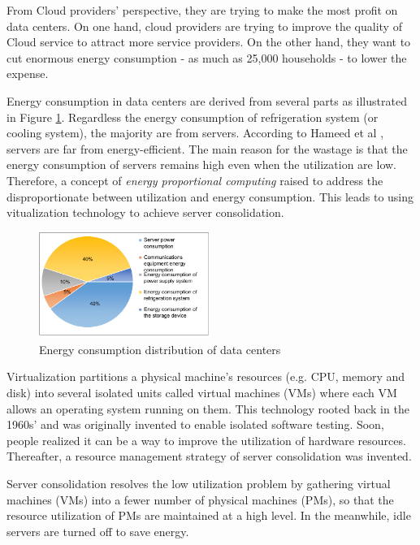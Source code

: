 From Cloud providers' perspective, they are trying to make the most profit on data centers.
On one hand, cloud providers are trying to improve the quality of  Cloud service to attract more service providers.  
On the other hand, they want to cut enormous energy consumption 
- as much as 25,000 households \cite{Kaplan:up01fR-k} - to lower the expense. 

Energy consumption in data centers are derived from several parts as 
illustrated in Figure \ref{fig:consumption}. 
Regardless the energy consumption of refrigeration system (or cooling system), 
the majority are from servers.
According to Hameed et al \cite{Hameed:2016cma}, 
servers are far from energy-efficient. 
The main reason for the wastage is that the energy consumption of servers remains high even when the utilization are low. Therefore, a concept of
\emph{energy proportional computing} \cite{Barroso:2007jt} raised to address the disproportionate between utilization and energy consumption. This leads to 
using vitualization technology to achieve server consolidation.
\begin{figure}
	\centering
	\includegraphics[width=0.5\textwidth]{pics/energyConsumption.png}
	\caption{Energy consumption distribution of data centers \cite{Rong:2016js}}
	\label{fig:consumption}
\end{figure}

Virtualization \cite{Uhlig:2005do} partitions a physical machine's resources (e.g. CPU, memory and disk) into several isolated units called virtual machines (VMs) where each VM allows an operating system running on them. This technology rooted back in the 1960s' and was originally invented to enable isolated software testing. Soon, people realized it can be a way to improve the utilization of hardware resources. Thereafter, a resource management strategy of server consolidation was invented.

Server consolidation \cite{Zhang:2010vo} resolves the low utilization problem by gathering virtual machines (VMs) into a fewer number of physical machines (PMs), so that the resource utilization of PMs are maintained at a high level.  
In the meanwhile, idle servers are turned off to save energy.

